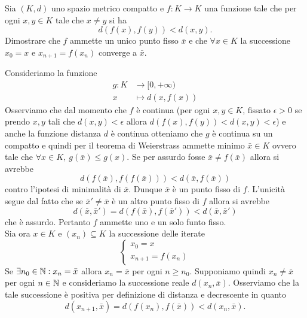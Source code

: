 \documentclass[a4paper]{article}\par \usepackage{style}\par
\begin{document}
\begin{es}
  Sia $ (K, d) $ uno spazio metrico compatto e $ f \colon K \to K $ una funzione tale che per ogni $ x, y \in K $ tale che $ x \neq y $ si ha \[d(f(x), f(y)) < d(x, y).\] Dimostrare che $ f $ ammette un unico punto fisso $ \bar{x} $ e che $ \forall x \in K $ la successione $ x_0 = x $ e $ x_{n + 1} = f(x_n) $ converge a $ \bar{x} $.
\end{es}\par Consideriamo la funzione
\begin{align*}
  g \colon K & \to [0, +\infty) \\
  x & \mapsto d(x, f(x))
\end{align*}
Osserviamo che dal momento che $ f $ è continua (per ogni $ x, y \in K $, fissato $ \epsilon > 0 $ se prendo $ x, y $ tali che $ d(x, y) < \epsilon $ allora $ d(f(x), f(y)) < d(x, y) < \epsilon $) e anche la funzione distanza $ d $ è continua otteniamo che $ g $ è continua su un compatto e quindi per il teorema di Weierstrass ammette minimo $ \bar{x} \in K $ ovvero tale che $ \forall x \in K, \ g(\bar{x}) \leq g(x) $. Se per assurdo fosse $ \bar{x} \neq f(\bar{x}) $ allora si avrebbe
\begin{equation*}
  d(f(\bar{x}), f(f(\bar{x}))) < d(\bar{x}, f(\bar{x}))
\end{equation*}
contro l'ipotesi di minimalità di $ \bar{x} $. Dunque $ \bar{x} $ è un punto fisso di $ f $. L'unicità segue dal fatto che se $ \bar{x}' \neq \bar{x} $ è un altro punto fisso di $ f $ allora si avrebbe
\begin{equation*}
  d(\bar{x}, \bar{x}') = d(f(\bar{x}), f(\bar{x}')) < d(\bar{x}, \bar{x}')
\end{equation*}
che è assurdo. Pertanto $ f $ ammette uno e un solo funto fisso. \\
Sia ora $ x \in K $ e $ (x_n) \subseteq K $ la successione delle iterate
\begin{equation*}
  \begin{cases}
    x_0 = x \\
    x_{n + 1} = f(x_n)
  \end{cases}
\end{equation*}
Se $ \exists n_0 \in \mathbb{N} : x_n = \bar{x} $ allora $ x_n = \bar{x} $ per ogni $ n \geq n_0 $. Supponiamo quindi $ x_n \neq \bar{x} $ per ogni $ n \in \mathbb{N} $ e consideriamo la successione reale $ d(x_n, \bar{x}) $. Osserviamo che la tale successione è positiva per definizione di distanza e decrescente in quanto
\begin{equation*}
  d(x_{n + 1}, \bar{x}) = d(f(x_n), f(\bar{x})) < d(x_n, \bar{x}).
\end{equation*}
\end{document}
